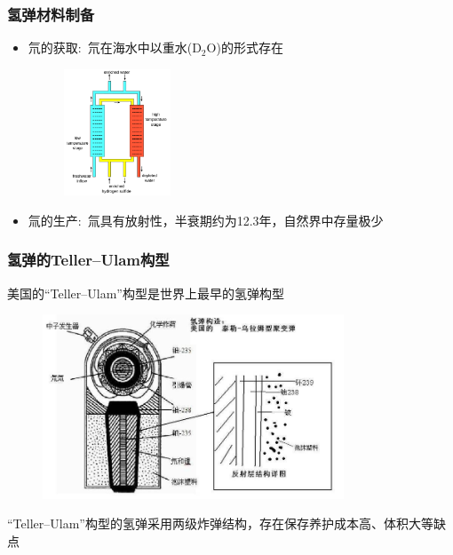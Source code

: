 \begin{frame}
    \frametitle{氢弹材料制备}
    \begin{itemize}
	    \item 氘的获取:~氘在海水中以重水($\mathrm{D}_2\mathrm{O}$)的形式存在\\
		    {\fontsize{7.2pt}{6.2pt}\selectfont{海水中氘的含量约为氢的0.015\%，可通过电解法或蒸馏法，从重水中分离提取出氘}}
    \vspace{-0.2cm}
    \begin{figure}
        \includegraphics[width=0.3\textwidth]{Figures_History/Heavy_Water.png}
    \end{figure}
        \item 氚的生产:~氚具有放射性，半衰期约为12.3年，自然界中存量极少\\
		{\fontsize{7.2pt}{6.2pt}}
    \end{itemize}
\end{frame}

\begin{frame}
	\frametitle{氢弹的\textrm{Teller–Ulam}构型}
	美国的``\textrm{Teller–Ulam}''构型是世界上最早的氢弹构型\\
    \vspace{-0.3cm}
    \begin{figure}
        \includegraphics[width=0.8\textwidth]{Figures_History/U-T_design.jpg}
    \end{figure}
    ``\textrm{Teller–Ulam}''构型的氢弹采用两级炸弹结构，存在保存养护成本高、体积大等缺点
\end{frame}

